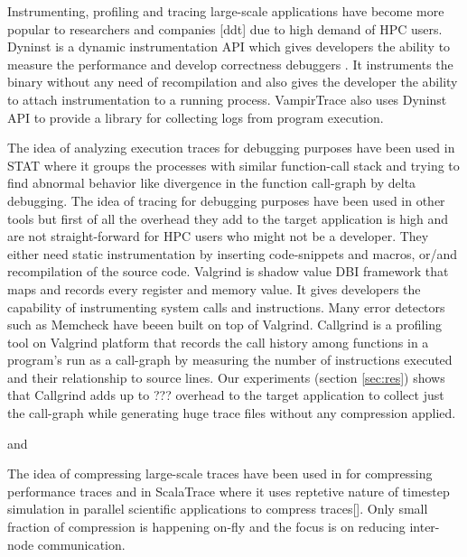 Instrumenting, profiling and tracing large-scale applications have become more popular to researchers and companies [ddt] due to high demand of HPC users. 
Dyninst\cite{dyninst} is a dynamic instrumentation API which gives developers the ability to measure the performance \cite{openss}\cite{tau} and develop correctness debuggers \cite{stat}. It instruments the binary without any need of recompilation and also gives the developer the ability to attach instrumentation to a running process. VampirTrace\cite{vampirt} also uses Dyninst API to provide a library for collecting logs from program execution. 

The idea of analyzing execution traces for debugging purposes have been used in STAT\cite{stat} where it groups the processes with similar function-call stack and trying to find abnormal behavior like divergence in the function call-graph by delta debugging. The idea of tracing for debugging purposes have been used in other tools but first of all the overhead they add to the target application is high and are not straight-forward for HPC users who might not be a developer. They either need static instrumentation by inserting code-snippets and macros, or/and recompilation of the source code. 
Valgrind\cite{valgrind} is shadow value DBI framework that maps and records every register and memory value. It gives developers the capability of instrumenting system calls and instructions. Many error detectors such as Memcheck \cite{memcheck} have beeen built on top of Valgrind. Callgrind \cite{callgrind} is a profiling tool  on Valgrind platform that records the call history among functions in a program's run as a call-graph by measuring the number of instructions executed and their relationship to source lines. Our experiments (section \ref{sec:res}) shows that Callgrind adds up to ??? overhead to the target application to collect just the call-graph while generating huge trace files without any compression applied.

and  \cite{ipm} \cite{tau} \cite{scorep} \cite{vtune}

The idea of compressing large-scale  traces have been used in \cite{event-flow-graph} for compressing performance traces and in ScalaTrace\cite{scalatrace} where it uses reptetive nature of timestep simulation in parallel scientific applications to compress traces[\cite{freitag}]. Only small fraction of compression is happening on-fly and the focus is on reducing inter-node communication. 